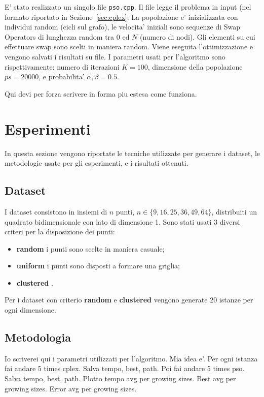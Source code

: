 \documentclass[
12pt, %
a4paper, %
oneside, %
headinclude,footinclude, %
BCOR5mm, %
]{scrartcl}
\begin{document}



E' stato realizzato un singolo file \texttt{pso.cpp}. Il file legge il problema in input (nel formato riportato in Sezione~\ref{sec:cplex}. La popolazione e' inizializzata con individui random (cicli sul grafo), le velocita' iniziali sono sequenze di Swap Operators di lunghezza random tra 0 ed $N$ (numero di nodi). Gli elementi su cui effettuare swap sono scelti in maniera random. Viene eseguita l'ottimizzazione e vengono salvati i risultati su file.
I parametri usati per l'algoritmo sono rispettivamente: numero di iterazioni $K = 100$, dimensione della popolazione $ps = 20000$, e probabilita' $\alpha, \beta = 0.5$.

Qui devi per forza scrivere in forma piu estesa come funziona.

\section{Esperimenti}\label{sec:exp}
In questa sezione vengono riportate le tecniche utilizzate per generare i dataset, le metodologie usate per gli esperimenti, e i risultati ottenuti.

\subsection{Dataset}
I dataset consistono in insiemi di $n$ punti, $n \in \{9, 16, 25, 36, 49, 64\}$, distribuiti un quadrato bidimensionale con lato di dimensione 1. Sono stati usati 3 diversi criteri per la disposizione dei punti:
\begin{itemize}
	\item \textbf{random} i punti sono scelte in maniera casuale;
	\item \textbf{uniform} i punti sono disposti a formare una griglia;
	\item \textbf{clustered} .
\end{itemize}
Per i dataset con criterio \textbf{random} e \textbf{clustered} vengono generate 20 istanze per ogni dimensione.

\subsection{Metodologia}
Io scriverei qui i parametri utilizzati per l'algoritmo.
Mia idea e'. Per ogni istanza fai andare 5 times cplex. Salva tempo, best, path.
Poi fai andare 5 times pso. Salva tempo, best, path. 
Plotto tempo avg per growing sizes. Best avg per growing sizes. Error avg per growing sizes.
\end{document}
